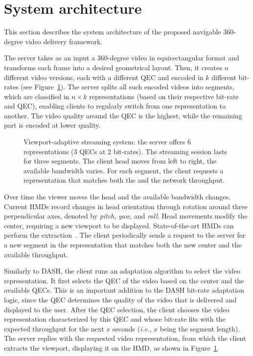 \section{System architecture}


This section describes the system architecture of the proposed
navigable $360$-degree video delivery framework.

The server takes as an input a $360$-degree video in
equirectangular format and transforms each frame into a desired
geometrical layout. Then, it creates $n$ different video
versions, each with a different \ac{QEC} and encoded in $k$ different
bit-rates (see Figure~\ref{fig:newdelivery}). The server
splits all such encoded videos into segments, which are classified in
$n\!\times\!k$ representations (based on their respective bit-rate and
\ac{QEC}), enabling clients to regularly switch from one
representation to another. The video quality around the
\ac{QEC} is the highest, while the remaining part is encoded at lower
quality.

\begin{figure}
   \centering
   
   \caption{Viewport-adaptive streaming system: the server offers \num{6} representations (\num{3} \acp{QEC} at \num{2} bit-rates). The streaming session lasts for three segments. The client head moves from left to right, the available bandwidth varies. For each segment, the client requests a representation that matches both the \FoV{} and the network throughput.}
   \label{fig:newdelivery}
\end{figure}

Over time the viewer moves the head and the
available bandwidth changes. Current \acp{HMD} record changes
in head orientation through rotation around three perpendicular axes,
denoted by \emph{pitch}, \emph{yaw}, and \emph{roll}.
Head movements modify the \FoV{} center, requiring a new viewport
to be displayed. State-of-the-art \acp{HMD} can perform the
extraction~\cite{fovhmds}. The client periodically sends a request
to the server for a new segment in the representation that
matches both the new \FoV{} center and the available throughput.

Similarly to \ac{DASH}, the client runs
an adaptation algorithm to select the video representation. It first
selects the \ac{QEC} of the video based on the \FoV{} center and
the available \acp{QEC}. This is an important addition to
the \ac{DASH} bit-rate adaptation logic, since the \ac{QEC} determines
the quality of the video that is delivered and displayed to the user.
After the \ac{QEC} selection, the client chooses the video
representation characterized by this \ac{QEC} and whose bit-rate fits
with the expected throughput for the next $x$ seconds (\textit{i.e.},
$x$ being the segment length). The server replies
with the requested video representation, from which the
client extracts the viewport, displaying it on the \ac{HMD}, as
shown in Figure~\ref{fig:newdelivery}.

